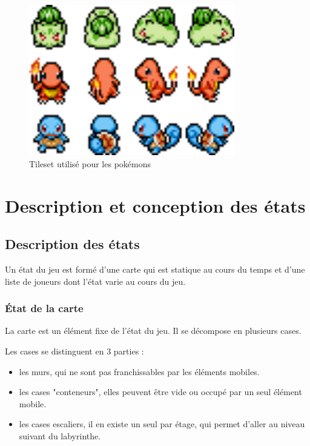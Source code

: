 \documentclass[a4paper,12pt]{article}
\begin{document}
    \begin{figure}[ht]
    \begin{center}
        \includegraphics[width=0.8\textwidth]{pokemonLatex.png}
    \end{center}
    \caption{Tileset utilisé pour les pokémons}
    \end{figure}



    \clearpage
    \section{Description et conception des états}
    
    \subsection{Description des états}
    Un état du jeu est formé d'une carte qui est statique au cours du temps et d'une liste de joueurs dont l'état varie au cours du jeu.
    
     \subsubsection{État de la carte}
     
     La carte est un élément fixe de l'état du jeu. Il se décompose en plusieurs cases.
    
     Les cases se distinguent en 3 parties : \begin{itemize}
    \item les murs, qui ne sont pas franchissables par les éléments mobiles.
    \item les cases "conteneurs", elles peuvent être vide ou occupé par un seul élément mobile.
    \item les cases escaliers, il en existe un seul par étage, qui permet d'aller au niveau suivant du labyrinthe.
    
    \end{itemize}
\end{document}
